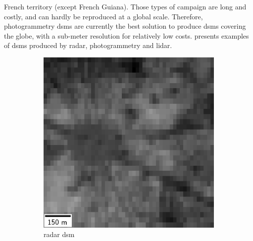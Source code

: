 French territory (except French Guiana). Those types of campaign are long and costly, and can hardly be reproduced at a global scale. Therefore, photogrammetry \acrshort{dsm}s are currently the best solution to produce \acrshort{dsm}s covering the globe, with a sub-meter resolution for relatively low costs.  presents examples of \acrshort{dsm}s produced by \acrshort{radar}, photogrammetry and \acrshort{lidar}.

\begin{figure}
    \begin{subfigure}[t]{0.31\linewidth}
        \flushleft
        \includegraphics[width=\linewidth]{Images/Chap_1/etoile_low_res_dsm.png}
        \caption{\acrshort{radar} \acrshort{dsm}}
        \label{fig:etoile_radar}
    \end{subfigure}\hfill
    \begin{subfigure}[t]{0.31\linewidth}
        \centering

\end{subfigure}
\end{figure}
